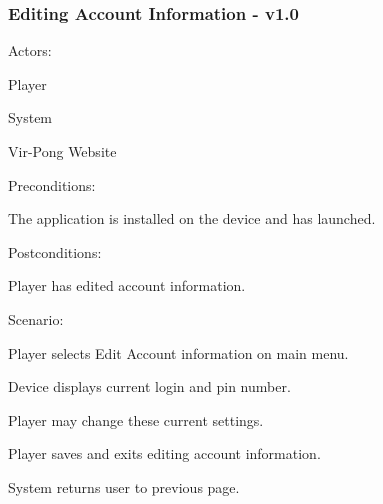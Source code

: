 \documentclass[12pt]{article}
\newenvironment{itemize*}%
  {\begin{itemize}%
  	\setlength{\parsep}{0pt}
    \setlength{\itemsep}{0pt}%
    \setlength{\parskip}{0pt}}%
  {\end{itemize}}
\newenvironment{enumerate*}%
  {\begin{enumerate}%
  	\setlength{\parsep}{0pt}
    \setlength{\itemsep}{0pt}%
    \setlength{\parskip}{0pt}}%
  {\end{enumerate}}
\begin{document}
\subsubsection*{Editing Account Information - v1.0}
Actors:
\begin{itemize*}
\item Player
\item System
\item Vir-Pong Website
\end{itemize*}
Preconditions:
\begin{itemize*}
\item The application is installed on the device and has launched.
\end{itemize*}
Postconditions:
\begin{itemize*}
\item Player has edited account information.
\end{itemize*}
Scenario:
\begin{enumerate*}
\item Player selects Edit Account information on main menu.
\item Device displays current login and pin number.
\item Player may change these current settings.
\item Player saves and exits editing account information.
\item System returns user to previous page.
\end{enumerate*} 

\onehalfspacing



\end{document}
